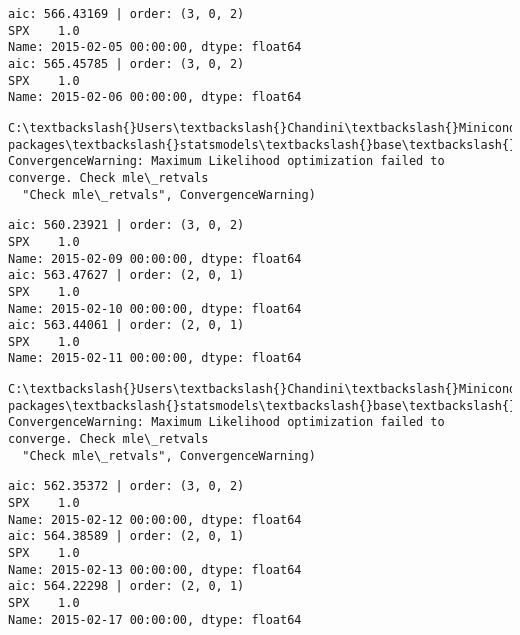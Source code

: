 \documentclass[11pt]{article}
\begin{document}
    \begin{Verbatim}[commandchars=\\\{\}]
aic: 566.43169 | order: (3, 0, 2)
SPX    1.0
Name: 2015-02-05 00:00:00, dtype: float64
aic: 565.45785 | order: (3, 0, 2)
SPX    1.0
Name: 2015-02-06 00:00:00, dtype: float64

    \end{Verbatim}

    \begin{Verbatim}[commandchars=\\\{\}]
C:\textbackslash{}Users\textbackslash{}Chandini\textbackslash{}Miniconda3\textbackslash{}envs\textbackslash{}auquan\textbackslash{}lib\textbackslash{}site-packages\textbackslash{}statsmodels\textbackslash{}base\textbackslash{}model.py:496: ConvergenceWarning: Maximum Likelihood optimization failed to converge. Check mle\_retvals
  "Check mle\_retvals", ConvergenceWarning)

    \end{Verbatim}

    \begin{Verbatim}[commandchars=\\\{\}]
aic: 560.23921 | order: (3, 0, 2)
SPX    1.0
Name: 2015-02-09 00:00:00, dtype: float64
aic: 563.47627 | order: (2, 0, 1)
SPX    1.0
Name: 2015-02-10 00:00:00, dtype: float64
aic: 563.44061 | order: (2, 0, 1)
SPX    1.0
Name: 2015-02-11 00:00:00, dtype: float64

    \end{Verbatim}

    \begin{Verbatim}[commandchars=\\\{\}]
C:\textbackslash{}Users\textbackslash{}Chandini\textbackslash{}Miniconda3\textbackslash{}envs\textbackslash{}auquan\textbackslash{}lib\textbackslash{}site-packages\textbackslash{}statsmodels\textbackslash{}base\textbackslash{}model.py:496: ConvergenceWarning: Maximum Likelihood optimization failed to converge. Check mle\_retvals
  "Check mle\_retvals", ConvergenceWarning)

    \end{Verbatim}

    \begin{Verbatim}[commandchars=\\\{\}]
aic: 562.35372 | order: (3, 0, 2)
SPX    1.0
Name: 2015-02-12 00:00:00, dtype: float64
aic: 564.38589 | order: (2, 0, 1)
SPX    1.0
Name: 2015-02-13 00:00:00, dtype: float64
aic: 564.22298 | order: (2, 0, 1)
SPX    1.0
Name: 2015-02-17 00:00:00, dtype: float64

    \end{Verbatim}
\end{document}
